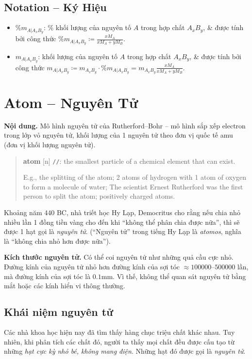\documentclass{article}
\begin{document}
\subsection*{Notation -- Ký Hiệu}

\begin{itemize}
	\item $\%m_{A|A_xB_y}$: \% khối lượng của nguyên tố $A$ trong hợp chất $A_xB_y$, \& được tính bởi công thức $\%m_{A|A_xB_y}\coloneqq\frac{xM_A}{xM_A + yM_B}$.
	\item $m_{A|A_xB_y}$: khối lượng của nguyên tố $A$ trong hợp chất $A_xB_y$, \& được tính bởi công thức $m_{A|A_xB_y}\coloneqq m_{A_xB_y}\cdot\%m_{A|A_xB_y} = m_{A_xB_y}\frac{xM_A}{xM_A + yM_B}$.
\end{itemize}


\section{Atom -- Nguyên Tử}
\textsf{\textbf{Nội dung.} Mô hình nguyên tử của Rutherford--Bohr -- mô hình sắp xếp electron trong lớp vỏ nguyên tử, khối lượng của 1 nguyên tử theo đơn vị quốc tế amu (đơn vị khối lượng nguyên tử).}
\begin{quotation}
	\textbf{atom} [n] \texttt{/}\texttt{/}: the smallest particle of a chemical element that can exist.
	
	E.g., the splitting of the atom; 2 atoms of hydrogen with 1 atom of oxygen to form a molecule of water; The scientist Ernest Rutherford was the first person to split the atom; positively charged atoms.
\end{quotation}
Khoảng năm 440 BC, nhà triết học Hy Lạp, Democritus cho rằng nếu chia nhỏ nhiều lần 1 đồng tiền vàng cho đến khi ``không thể phân chia được nữa'', thì sẽ được 1 hạt gọi là \textit{nguyên tử}. (``Nguyên tử'' trong tiếng Hy Lạp là \textit{atomos}, nghĩa là ``không chia nhỏ hơn được nữa'').

\textbf{Kích thước nguyên tử.} Có thể coi nguyên tử như những quả cầu cực nhỏ. Đường kính của nguyên tử nhỏ hơn đường kính của sợi tóc $\approx100000$--$500000$ lần, mà đường kính của sợi tóc là $0.1$mm. Vì thế, không thể quan sát nguyên tử bằng mắt hoặc các kính hiển vi thông thường.

\subsection{Khái niệm nguyên tử}
Các nhà khoa học hiện nay đã tìm thấy hàng chục triệu chất khác nhau. Tuy nhiên, khi phân tích các chất đó, người ta thấy mọi chất đều được cấu tạo từ những \textit{hạt cực kỳ nhỏ bé, không mang điện}. Những hạt đó được gọi là \textit{nguyên tử}.
\end{document}
